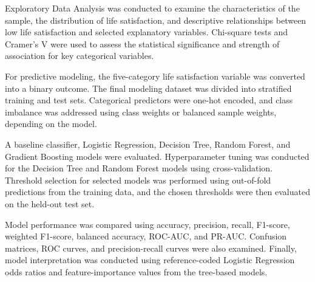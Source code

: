 \documentclass[12pt]{article}
\begin{document}
Exploratory Data Analysis was conducted to examine the characteristics of the sample, the distribution of life satisfaction, and descriptive relationships between low life satisfaction and selected explanatory variables. Chi-square tests and Cramer's V were used to assess the statistical significance and strength of association for key categorical variables.

For predictive modeling, the five-category life satisfaction variable was converted into a binary outcome. The final modeling dataset was divided into stratified training and test sets. Categorical predictors were one-hot encoded, and class imbalance was addressed using class weights or balanced sample weights, depending on the model.

A baseline classifier, Logistic Regression, Decision Tree, Random Forest, and Gradient Boosting models were evaluated. Hyperparameter tuning was conducted for the Decision Tree and Random Forest models using cross-validation. Threshold selection for selected models was performed using out-of-fold predictions from the training data, and the chosen thresholds were then evaluated on the held-out test set.

Model performance was compared using accuracy, precision, recall, F1-score, weighted F1-score, balanced accuracy, ROC-AUC, and PR-AUC. Confusion matrices, ROC curves, and precision-recall curves were also examined. Finally, model interpretation was conducted using reference-coded Logistic Regression odds ratios and feature-importance values from the tree-based models.
\end{document}
